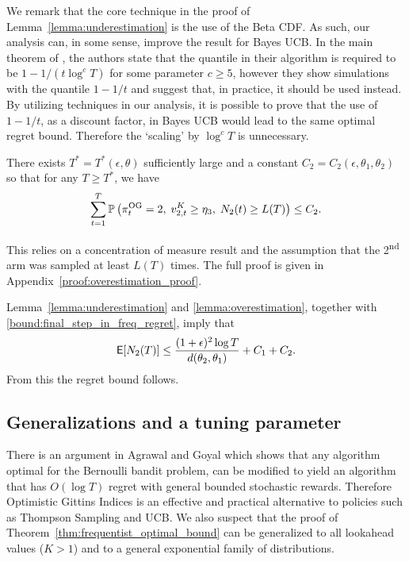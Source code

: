 \begin{myproof}[Proof.]
\begin{myproof}
		We remark that the core technique in the proof of Lemma~\ref{lemma:underestimation} is the use of the Beta CDF. As such, our analysis can, in some sense, improve the result for Bayes UCB. In the main theorem of \cite{kaufmann2012thompson}, the authors state that the quantile in their algorithm is required to be $1 - 1/(t \log^c T)$ for some parameter $c \ge 5$, however they show simulations with the quantile $1 -1/t$ and suggest that, in practice, it should be used instead. By utilizing techniques in our analysis, it is possible to prove that the use of $1-1/t$, as a discount factor, in Bayes UCB would lead to the same optimal regret bound. Therefore the `scaling' by $\log^c T$ is unnecessary.
	\end{myproof}
	\begin{lemma} \label{lemma:overestimation}
		There exists $T^* = T^*(\epsilon, \theta)$ sufficiently large and a constant $C_2 = C_2(\epsilon, \theta_1, \theta_2)$ so that for any $T \ge T^*$, we have
		\begin{equation*}
		\sum_{t=1}^T \P{\pi_t^{\rm OG} = 2,\; v^K_{2,t} \ge \eta_3, \; N_2(t) \ge L(T)} \le C_2.
		\end{equation*}
	\end{lemma}
	\begin{myproof}
		This relies on a concentration of measure result and the assumption that the 2\textsuperscript{nd} arm was sampled at least $L(T)$ times. The full proof is given in Appendix~\ref{proof:overestimation_proof}.
	\end{myproof}
	Lemma~\ref{lemma:underestimation} and \ref{lemma:overestimation}, together with \eqref{bound:final_step_in_freq_regret}, imply that
	\[
	\E[N_2(T)] \le \frac{(1+\epsilon)^2 \log T}{d(\theta_2, \theta_1)} +  C_1 +  C_2.
	\]
	From this the regret bound follows.
\end{myproof}
\subsection{Generalizations and a tuning parameter}
There is an argument in Agrawal and Goyal \cite{agrawalanalysis} which shows that any algorithm optimal for the Bernoulli bandit problem, can be modified to yield an algorithm that has $O(\log T)$ regret with general bounded stochastic rewards. Therefore Optimistic Gittins Indices is an effective and practical alternative to policies such as Thompson Sampling and UCB. We also suspect that the proof of Theorem~\ref{thm:frequentist_optimal_bound} can be generalized to all lookahead values ($K > 1$) and to a general exponential family of distributions.

